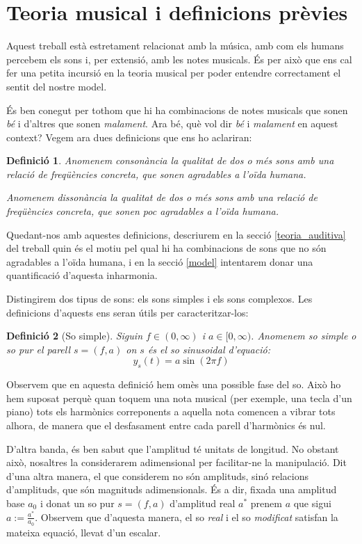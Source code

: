 \documentclass{article}
\theoremstyle{math}
\newtheorem{definition}{Definició}[section]
\theoremstyle{TheoremNum}
\newcommand{\0}{\ensuremath{\vb{0}}}
\begin{document}
\section{Teoria musical i definicions prèvies}\label{teoria_musical}
Aquest treball està estretament relacionat amb la música, amb com els humans percebem els sons i, per extensió, amb les notes musicals. És per això que ens cal fer una petita incursió en la teoria musical per poder entendre correctament el sentit del nostre model.\par
És ben conegut per tothom que hi ha combinacions de notes musicals que sonen \textit{bé} i d'altres que sonen \textit{malament}. Ara bé, què vol dir \textit{bé} i \textit{malament} en aquest context? Vegem ara dues definicions que ens ho aclariran:
\begin{definition}
Anomenem \textit{consonància} la qualitat de dos o més sons amb una relació de freqüències concreta, que sonen agradables a l'oïda humana.\par
\noindent Anomenem \textit{dissonància} la qualitat de dos o més sons amb una relació de freqüències concreta, que sonen poc agradables a l'oïda humana.
\end{definition}
Quedant-nos amb aquestes definicions, descriurem en la secció \ref{teoria_auditiva} del treball quin és el motiu pel qual hi ha combinacions de sons que no són agradables a l'oïda humana, i en la secció \ref{model} intentarem donar una quantificació d'aquesta inharmonia.\par
Distingirem dos tipus de sons: els sons simples i els sons complexos. Les definicions d'aquests ens seran útils per caracteritzar-los:
\begin{definition}[So simple]
Siguin $f\in(0,\infty)$ i $a\in[0,\infty)$. Anomenem \textit{so simple} o \textit{so pur} el parell $s=(f, a)$ on $s$ és el so sinusoidal d'equació: $$y_s(t)=a\sin(2\pi f)$$
\end{definition}
\noindent Observem que en aquesta definició hem omès una possible fase del so. Això ho hem suposat perquè quan toquem una nota musical (per exemple, una tecla d'un piano) tots els harmònics correponents a aquella nota comencen a vibrar tots alhora, de manera que el desfasament entre cada parell d'harmònics és nul.\par D'altra banda, és ben sabut que l'amplitud té unitats de longitud. No obstant això, nosaltres la considerarem adimensional per facilitar-ne la manipulació. Dit d'una altra manera, el que considerem no són amplituds, sinó relacions d'amplituds, que són magnituds adimensionals. És a dir, fixada una amplitud base $a_0$ i donat un so pur $s=(f,a)$ d'amplitud real $a^*$ prenem $a$ que sigui $a:=\frac{a^*}{a_0}$. Observem que d'aquesta manera, el so \textit{real} i el so \textit{modificat} satisfan la mateixa equació, llevat d'un escalar.
\end{document}
